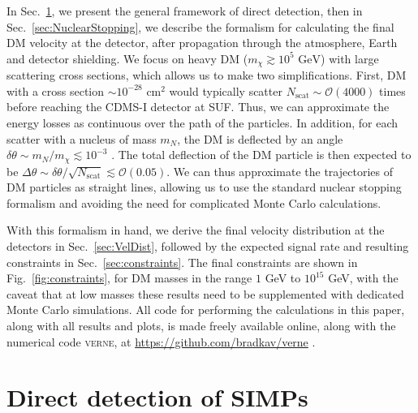 \documentclass[prd,twocolumn,showpacs,nofootinbib,aps]{revtex4-1}
\begin{document}
In Sec.~\ref{sec:DirectDetection}, we present the general framework of direct detection, then in Sec.~\ref{sec:NuclearStopping}, we describe the formalism for calculating the final DM velocity at the detector, after propagation through the atmosphere, Earth and detector shielding. We focus on heavy DM ($m_\chi \gtrsim 10^5 \,\,\mathrm{GeV}$) with large scattering cross sections, which allows us to make two simplifications. First, DM with a cross section $\sim 10^{-28}\,\,\mathrm{cm}^2$ would typically scatter $N_\mathrm{scat}\sim\mathcal{O}(4000)$ times before reaching the CDMS-I detector at SUF. Thus, we can approximate the energy losses as continuous over the path of the particles. In addition, for each scatter with a nucleus of mass $m_N$, the DM is deflected by an angle $\delta \theta \sim m_N/m_\chi \lesssim 10^{-3}$ \cite{Kavanagh:2016pyr}. The total deflection of the DM particle is then expected to be $\Delta \theta \sim \delta \theta/\sqrt{N_\mathrm{scat}} \lesssim \mathcal{O}(0.05)$. We can thus approximate the trajectories of DM particles as straight lines, allowing us to use the standard nuclear stopping formalism and avoiding the need for complicated Monte Carlo calculations.

With this formalism in hand, we derive the final velocity distribution at the detectors in Sec.~\ref{sec:VelDist}, followed by the expected signal rate and resulting constraints in Sec.~\ref{sec:constraints}. The final constraints are shown in Fig.~\ref{fig:constraints}, for DM masses in the range $1$ GeV to $10^{15}$ GeV, with the caveat that at low masses these results need to be supplemented with dedicated Monte Carlo simulations. All code for performing the calculations in this paper, along with all results and plots, is made freely available online, along with the numerical code \textsc{verne}, at \href{https://github.com/bradkav/verne}{https://github.com/bradkav/verne} \cite{verne}.


\section{Direct detection of SIMPs}
\label{sec:DirectDetection}
\end{document}
